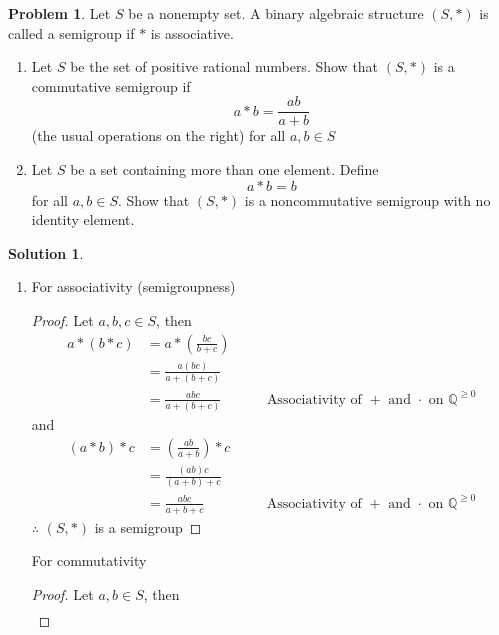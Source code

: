 \documentclass[10pt]{article}
\theoremstyle{definition}
\newtheorem{problem}{Problem}
\newtheorem{soln}{Solution}
\newcommand{\justif}[2]{&{#1}&\text{#2}}
\begin{document}
\begin{problem}
Let $S$ be a nonempty set. A binary algebraic structure $(S, *)$ is called
a semigroup if $*$ is associative.
\begin{enumerate}[label=(\alph*)]
  \item Let $S$ be the set of positive rational numbers. Show that $(S, *)$
        is a commutative semigroup if
        $$a*b=\frac{ab}{a+b}$$
        (the usual operations on the right) for all $a,b\in S$
  \item Let $S$ be a set containing more than one element. Define
        $$a*b=b$$
        for all $a,b\in S$. Show that $(S,*)$ is a noncommutative semigroup with no identity element.
\end{enumerate}
\end{problem}
\begin{soln}~
  \begin{enumerate}[label=(\alph*)]
    \item For associativity (semigroupness)
          \begin{proof}
            Let $a,b,c\in S$, then
            \begin{align*}
              a*(b*c) & = a*\left(\frac{bc}{b+c}\right)                                                                \\
                      & = \frac{a(bc)}{a+(b+c)}                                                                        \\
                      & = \frac{abc}{a+(b+c)} \justif{\quad}{Associativity of $+$ and $\cdot$ on $\mathbb{Q}^{\geq0}$}
            \end{align*}
            and
            \begin{align*}
              (a*b)*c & = \left(\frac{ab}{a+b}\right)*c                                                               \\
                      & = \frac{(ab)c}{(a+b)+c}                                                                       \\
                      & = \frac{abc}{a+b+c}  \justif{\quad}{Associativity of $+$ and $\cdot$ on $\mathbb{Q}^{\geq0}$}
            \end{align*}
            $\therefore$ $(S, *)$ is a semigroup\qedhere
          \end{proof}
          For commutativity
          \begin{proof}
            Let $a,b\in S$, then
            \begin{align*}

\end{align*}
\end{proof}
\end{enumerate}
\end{soln}
\end{document}
